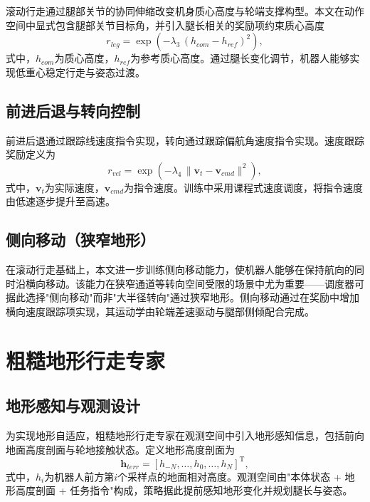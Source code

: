 滚动行走通过腿部关节的协同伸缩改变机身质心高度与轮端支撑构型。本文在动作空间中显式包含腿部关节目标角，并引入腿长相关的奖励项约束质心高度
\begin{equation}
  r_{leg} = \exp\left(-\lambda_3\,(h_{com} - h_{ref})^2\right),
  \label{eq:rleg}
\end{equation}
式中，$h_{com}$为质心高度，$h_{ref}$为参考质心高度。通过腿长变化调节，机器人能够实现低重心稳定行走与姿态过渡。

\subsection{前进后退与转向控制}

前进后退通过跟踪线速度指令实现，转向通过跟踪偏航角速度指令实现。速度跟踪奖励定义为
\begin{equation}
  r_{vel} = \exp\left(-\lambda_4\,\|\boldsymbol{v}_t - \boldsymbol{v}_{cmd}\|^2\right),
  \label{eq:rvel}
\end{equation}
式中，$\boldsymbol{v}_t$为实际速度，$\boldsymbol{v}_{cmd}$为指令速度。训练中采用课程式速度调度，将指令速度由低速逐步提升至高速。

\subsection{侧向移动（狭窄地形）}

在滚动行走基础上，本文进一步训练侧向移动能力，使机器人能够在保持航向的同时沿横向移动。该能力在狭窄通道等转向空间受限的场景中尤为重要——调度器可据此选择"侧向移动"而非"大半径转向"通过狭窄地形。侧向移动通过在奖励中增加横向速度跟踪项实现，其运动学由轮端差速驱动与腿部侧倾配合完成。

\section{粗糙地形行走专家}

\subsection{地形感知与观测设计}

为实现地形自适应，粗糙地形行走专家在观测空间中引入地形感知信息，包括前向地面高度剖面与轮地接触状态。定义地形高度剖面为
\begin{equation}
  \boldsymbol{h}_{terr} = \left[h_{-N}, \ldots, h_0, \ldots, h_{N}\right]^{\mathrm{T}},
  \label{eq:terrain-probe}
\end{equation}
式中，$h_i$为机器人前方第$i$个采样点的地面相对高度。观测空间由"本体状态 + 地形高度剖面 + 任务指令"构成，策略据此提前感知地形变化并规划腿长与姿态。

